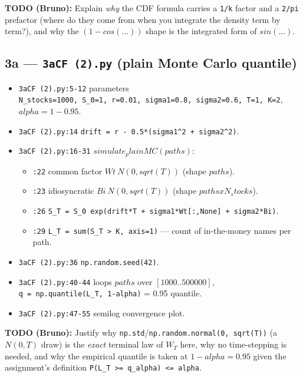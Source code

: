 \documentclass[
  11pt,
]{article}
\providecommand{\tightlist}{%
  \setlength{\itemsep}{0pt}\setlength{\parskip}{0pt}}
\begin{document}
\textbf{TODO (Bruno):} Explain \emph{why} the CDF formula carries a
\texttt{1/k} factor and a \texttt{2/pi} prefactor (where do they come
from when you integrate the density term by term?), and why the
\((1 - cos(...))\) shape is the integrated form of \(sin(...)\).

\hypertarget{a-3acf-2.py-plain-monte-carlo-quantile}{%
\subsection{\texorpdfstring{3a --- \texttt{3aCF\ (2).py} (plain Monte
Carlo
quantile)}{3a --- 3aCF (2).py (plain Monte Carlo quantile)}}\label{a-3acf-2.py-plain-monte-carlo-quantile}}

\begin{itemize}
\tightlist
\item
  \texttt{3aCF\ (2).py:5-12} parameters
  \texttt{N\_stocks=1000,\ S\_0=1,\ r=0.01,\ sigma1=0.8,\ sigma2=0.6,\ T=1,\ K=2},
  \(alpha = 1-0.95\).
\item
  \texttt{3aCF\ (2).py:14}
  \texttt{drift\ =\ r\ -\ 0.5*(sigma1\^{}2\ +\ sigma2\^{}2)}.
\item
  \texttt{3aCF\ (2).py:16-31} \(simulate_plainMC(paths)\):

  \begin{itemize}
  \tightlist
  \item
    \texttt{:22} common factor \(Wt ~ N(0, sqrt(T))\) (shape \(paths\)).
  \item
    \texttt{:23} idiosyncratic \(Bi ~ N(0, sqrt(T))\) (shape
    \(paths x N_stocks\)).
  \item
    \texttt{:26}
    \texttt{S\_T\ =\ S\_0\ exp(drift*T\ +\ sigma1*Wt{[}:,None{]}\ +\ sigma2*Bi)}.
  \item
    \texttt{:29} \texttt{L\_T\ =\ sum(S\_T\ \textgreater{}\ K,\ axis=1)}
    --- count of in-the-money names per path.
  \end{itemize}
\item
  \texttt{3aCF\ (2).py:36} \texttt{np.random.seed(42)}.
\item
  \texttt{3aCF\ (2).py:40-44} loops \(paths\) over \([1000..500000]\),
  \texttt{q\ =\ np.quantile(L\_T,\ 1-alpha)} = 0.95 quantile.
\item
  \texttt{3aCF\ (2).py:47-55} semilog convergence plot.
\end{itemize}

\textbf{TODO (Bruno):} Justify why
\texttt{np.std}/\texttt{np.random.normal(0,\ sqrt(T))} (a \(N(0,T)\)
draw) is the \emph{exact} terminal law of \(W_T\) here, why no
time-stepping is needed, and why the empirical quantile is taken at
\(1 - alpha = 0.95\) given the assignment's definition
\texttt{P(L\_T\ \textgreater{}=\ q\_alpha)\ \textless{}=\ alpha}.
\end{document}

